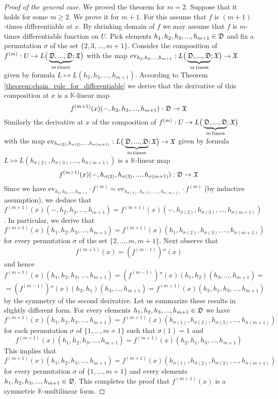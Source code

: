 \begin{proof}[Proof of the general case]
We proved the theorem for $m = 2$. Suppose that it holds for some $m \geq 2$. We prove it for $m + 1$. For this assume that $f$ is $(m+1)$-times differentiable at $x$. By shrinking domain of $f$ we may assume that $f$ is $m$-times differentiable function on $U$. Pick elements $h_1,h_2,h_3,...,h_{m+1}\in {\mathfrak D}$ and fix a permutation $\sigma$ of the set $\{2,3,...,m+1\}$. Consider the composition of $f^{(m)}:U\rightarrow L\big(\underbrace{{\mathfrak D},...,{\mathfrak D}}_{m\,\mathrm{times}};{\mathfrak X}\big)$ with the map $\mathrm{ev}_{h_2,h_3,...,h_{m+1}}:L\big(\underbrace{{\mathfrak D},...,{\mathfrak D}}_{m\,\mathrm{times}};{\mathfrak X}\big) \rightarrow {\mathfrak X}$ given by formula $L\mapsto L(h_2,h_3,...,h_{m+1})$. According to Theorem \ref{theorem:chain_rule_for_differentiable} we derive that the derivative of this composition at $x$ is a $\mathbb{K}$-linear map 
$$f^{(m+1)}(x)(-,h_2,h_3,...,h_{m+1}):{\mathfrak D}\rightarrow {\mathfrak X}$$
Similarly the derivative at $x$ of the composition of $f^{(m)}:U\rightarrow L\big(\underbrace{{\mathfrak D},...,{\mathfrak D}}_{m\,\mathrm{times}};{\mathfrak X}\big)$ with the map $\mathrm{ev}_{h_{\sigma(2)},h_{\sigma(3)},...,h_{\sigma(m+1)}}:L\big(\underbrace{{\mathfrak D},...,{\mathfrak D}}_{m\,\mathrm{times}};{\mathfrak X}\big) \rightarrow {\mathfrak X}$ given by formula $L\mapsto L(h_{\sigma(2)},h_{\sigma(3)},...,h_{\sigma(m+1)})$ is a $\mathbb{K}$-linear map
$$f^{(m+1)}(x)(-,h_{\sigma(2)},h_{\sigma(3)},...,h_{\sigma(m+1)}):{\mathfrak D}\rightarrow {\mathfrak X}$$
Since we have $\mathrm{ev}_{h_2,h_3,...,h_{m+1}} \cdot f^{(m)} = \mathrm{ev}_{h_{\sigma(2)},h_{\sigma(3)},...,h_{\sigma(m+1)}} \cdot f^{(m)}$ (by inductive assumption), we deduce that $f^{(m+1)}(x)(-,h_2,h_3,...,h_{m+1}) = f^{(m+1)}(x)(-,h_{\sigma(2)},h_{\sigma(3)},...,h_{\sigma(m+1)})$. In particular, we derive that 
$$f^{(m+1)}(x)(h_1,h_2,h_3,...,h_{m+1}) = f^{(m+1)}(x)(h_1,h_{\sigma(2)},h_{\sigma(3)},...,h_{\sigma(m+1)})$$
for every permutation $\sigma$ of the set $\{2,...,m,m+1\}$. Next observe that
$$f^{(m+1)}(x) = \left(f^{(m-1)}\right)''(x)$$
and hence
$$f^{(m+1)}(x)(h_1,h_2,h_3,...,h_{m+1}) = \left(f^{(m-1)}\right)''(x)(h_1,h_2)(h_3,...,h_{m+1}) =$$
$$= \left(f^{(m-1)}\right)''(x)(h_2,h_1)(h_3,...,h_{m+1}) = f^{(m+1)}(x)(h_2,h_1,h_3,...,h_{m+1})$$
by the symmetry of the second derivative. Let us summarize these results in slightly different form. For every elements $h_1,h_2,h_3,...,h_{m+1}\in {\mathfrak D}$ we have
$$f^{(m+1)}(x)(h_1,h_2,h_3,...,h_{m+1}) = f^{(m+1)}(x)(h_{\sigma(1)},h_{\sigma(2)},h_{\sigma(3)},...,h_{\sigma(m+1)})$$
for each permutation $\sigma$ of $\{1,...,m+1\}$ such that $\sigma(1) = 1$ and 
$$f^{(m+1)}(x)(h_1,h_2,h_3,...,h_{m+1}) = f^{(m+1)}(x)(h_2,h_1,h_3,...,h_{m+1})$$
This implies that
$$f^{(m+1)}(x)(h_1,h_2,h_3,...,h_{m+1}) = f^{(m+1)}(x)(h_{\sigma(1)},h_{\sigma(2)},h_{\sigma(3)},...,h_{\sigma(m+1)})$$
for every permutation $\sigma$ of $\{1,...,m+1\}$ and every elements $h_1,h_2,h_3,...,h_{m+1}\in {\mathfrak D}$. This completes the proof that $f^{(m+1)}(x)$ is a symmetric $\mathbb{K}$-multilinear form.
\end{proof}

